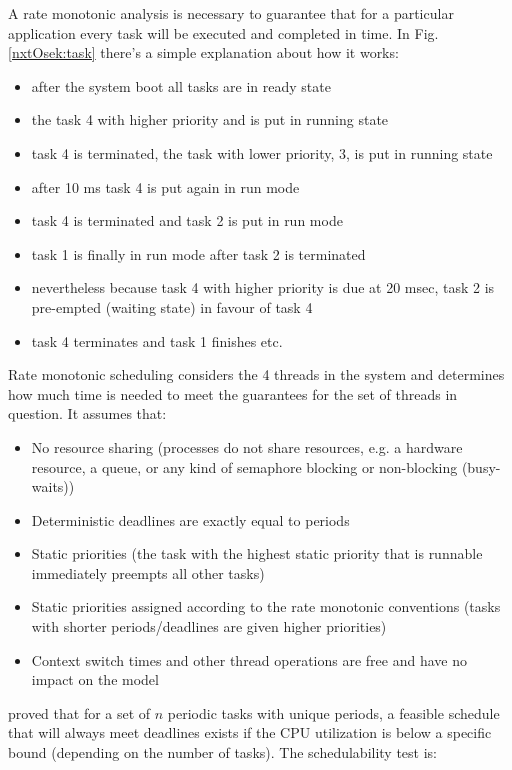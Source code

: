 A rate monotonic analysis is necessary to guarantee that for a particular application every task will be executed and completed in time. In Fig.\ref{nxtOsek:task} there's a simple explanation about how it works:
\begin{itemize}
 \item after the system boot all tasks are in ready state
 \item the task 4 with higher priority and is put in running state
 \item task 4 is terminated, the task with lower priority, 3, is put in running state
 \item after 10 ms task 4 is put again in run mode
 \item task 4 is terminated and task 2 is put in run mode
 \item task 1 is finally in run mode after task 2 is terminated
 \item nevertheless because task 4 with higher priority is due at 20 msec,
       task 2 is pre-empted (waiting state) in favour of task 4
 \item task 4 terminates and task 1 finishes etc.
\end{itemize}

Rate monotonic scheduling considers the 4 threads in the system and determines how much time is needed to meet the guarantees for the set of threads in question. It assumes that:
\begin{itemize}
\item No resource sharing (processes do not share resources, e.g. a hardware resource, a queue, or any kind of semaphore blocking or non-blocking (busy-waits))
\item Deterministic deadlines are exactly equal to periods
\item Static priorities (the task with the highest static priority that is runnable immediately preempts all other tasks)
\item Static priorities assigned according to the rate monotonic conventions (tasks with shorter periods/deadlines are given higher priorities)
 \item Context switch times and other thread operations are free and have no impact on the model
\end{itemize}

\citet{Liu73schedulingalgorithms} proved that for a set of $n$ periodic tasks with unique periods, a feasible schedule that will always meet deadlines exists if the CPU utilization is below a specific bound (depending on the number of tasks). The schedulability test is:

